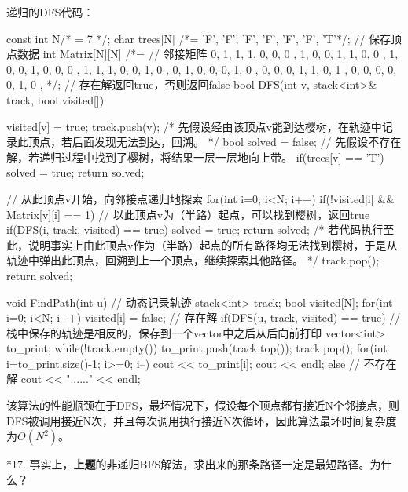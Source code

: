 递归的DFS代码：
\begin{cppcodeNum}[codetitle={递归的DFS解法}]
    const int N/* = 7 */;
    char trees[N] /*= {'F', 'F', 'F', 'F', 'F', 'F', 'T'}*/;    // 保存顶点数据
    int Matrix[N][N] /*= {    // 邻接矩阵
        { 0, 1, 1, 1, 0, 0, 0 },
        { 1, 0, 0, 1, 1, 0, 0 },
        { 1, 0, 0, 1, 0, 0, 0 },
        { 1, 1, 1, 0, 0, 1, 0 },
        { 0, 1, 0, 0, 0, 1, 0 },
        { 0, 0, 0, 1, 1, 0, 1 },
        { 0, 0, 0, 0, 0, 1, 0 },
    }*/;
    // 存在解返回true，否则返回false
    bool DFS(int v, stack<int>& track, bool visited[]) {
        visited[v] = true;
        track.push(v);  /* 先假设经由该顶点v能到达樱树，在轨迹中记录此顶点，若后面发现无法到达，回溯。 */
        bool solved = false;    // 先假设不存在解，若递归过程中找到了樱树，将结果一层一层地向上带。
        if(trees[v] == 'T') {
            solved = true;
            return solved;
        }

        // 从此顶点v开始，向邻接点递归地探索
        for(int i=0; i<N; i++) {
            if(!visited[i] && Matrix[v][i] == 1) {
                // 以此顶点v为（半路）起点，可以找到樱树，返回true
                if(DFS(i, track, visited) == true) {
                    solved = true;
                    return solved;
                }
            }
        }
        /* 若代码执行至此，说明事实上由此顶点v作为（半路）起点的所有路径均无法找到樱树，于是从轨迹中弹出此顶点，回溯到上一个顶点，继续探索其他路径。 */
        track.pop();
        return solved;
    }

    void FindPath(int u) {
        // 动态记录轨迹
        stack<int> track;
        bool visited[N];
        for(int i=0; i<N; i++) {
            visited[i] = false;
        }
        // 存在解
        if(DFS(u, track, visited) == true) {
            // 栈中保存的轨迹是相反的，保存到一个vector中之后从后向前打印
            vector<int> to_print;
            while(!track.empty()) {
                to_print.push(track.top());
                track.pop();
            }
            for(int i=to_print.size()-1; i>=0; i--) {
                cout << to_print[i];
            }
            cout << endl;
        } else {    // 不存在解
            cout << "......" << endl;
        }
    }
\end{cppcodeNum}
该算法的性能瓶颈在于DFS，最坏情况下，假设每个顶点都有接近N个邻接点，则DFS被调用接近N次，并且每次调用执行接近N次循环，因此算法最坏时间复杂度为$O(N^2)$。

\vspace{\baselineskip}

*17. 事实上，{\color{red}\textbf{上题}}的非递归BFS解法，求出来的那条路径一定是最短路径。为什么？


